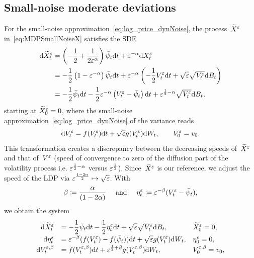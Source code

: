 \subsection{Small-noise moderate deviations}\label{sec:SmallNoiseMDP}
For the small-noise approximation~\eqref{eq:log_price_dynNoise}, the process~$\widetilde{X}^\varepsilon$ in~\eqref{eq:MDPSmallNoiseX} satisfies the SDE
\begin{align*}
\mathrm{d} \widetilde{X}^\varepsilon_t
 & = \displaystyle\left(-\frac{1}{2} + \frac{1}{2\varepsilon^{\alpha}}\right)\bar\psi_t\mathrm{d} t
+ \varepsilon^{-\alpha}\mathrm{d} X^{\varepsilon}_t\\
 & = \displaystyle-\frac{1}{2}\left(1 - \varepsilon^{-\alpha}\right)\bar\psi_t\mathrm{d} t
+ \varepsilon^{-\alpha}\left(-\frac{1}{2}V_t^\varepsilon \mathrm{d} t + \sqrt{\varepsilon}\sqrt{V_t^\varepsilon} \mathrm{d} B_t\right)\\
 & = \displaystyle
 -\frac{1}{2}\bar\psi_t\mathrm{d} t - \frac{1}{2}\varepsilon^{-\alpha}\left( V_t^\varepsilon - \bar\psi_t\right) \mathrm{d} t + 
\varepsilon^{\frac{1}{2}-\alpha}\sqrt{V_t^\varepsilon} \mathrm{d} B_t,
\end{align*}
starting at $\widetilde{X}^{\varepsilon}_0 = 0$, where the small-noise approximation~\eqref{eq:log_price_dynNoise} of the variance reads
$$
\mathrm{d} V_t^{\varepsilon} = \displaystyle  f(V_t^{\varepsilon})\mathrm{d} t + \sqrt{\varepsilon} g(V_t^{\varepsilon})\mathrm{d} W_t, 
\qquad V_0^{\varepsilon} = v_0.
$$
This transformation creates a discrepancy between the decreasing speeds of~$\widetilde{X}^{\varepsilon}$ and that of~$V^{\varepsilon}$ (speed of convergence to zero of the diffusion part of the volatility process i.e. $\varepsilon^{\frac{1}{2} - \alpha}$ versus $\varepsilon^{\frac{1}{2}}$). Since~$\widetilde{X}^{\varepsilon}$ is our reference, %
we adjust the speed of the LDP via $\varepsilon^{\frac{1 - 2\alpha}{2}}\mapsto \sqrt{\varepsilon}$. With 
\[\beta \coloneqq \frac{\alpha}{(1 - 2\alpha)} \quad \textup{ and } \quad \eta^\varepsilon_t \coloneqq \varepsilon^{-\beta}(V_t^\varepsilon - \bar\psi_t),\]
we obtain the system
\begin{equation}\label{eq:eps_MDP__eta_V}
\def\arraystretch{1.25}
\begin{array}{rll}
\D \widetilde{X}^\eps_t & = \displaystyle -\frac{1}{2}\bar\psi_t \D t -\frac{1}{2}\eta^\eps_t \D t + \sqrt{\eps}\sqrt{V_t^\eps} \D B_t, 
& \widetilde{X}_0^\eps = 0,\\
\D \eta_{t}^\eps & = \displaystyle \eps^{-\beta}(f(V_t^\eps)-f(\bar\psi_t))\D t + \sqrt{\eps}g(V_t^\eps)\D W_t, & \eta_{0}^\eps = 0,\\
\D V_t^{\eps,\beta} & = \displaystyle  f(V_t^{\eps,\beta})\D t + \eps^{\frac{1}{2} + \beta}g(V_t^{\eps,\beta})\D W_t, & V_0^{\eps,\beta} = v_0,
\end{array}
\end{equation}
